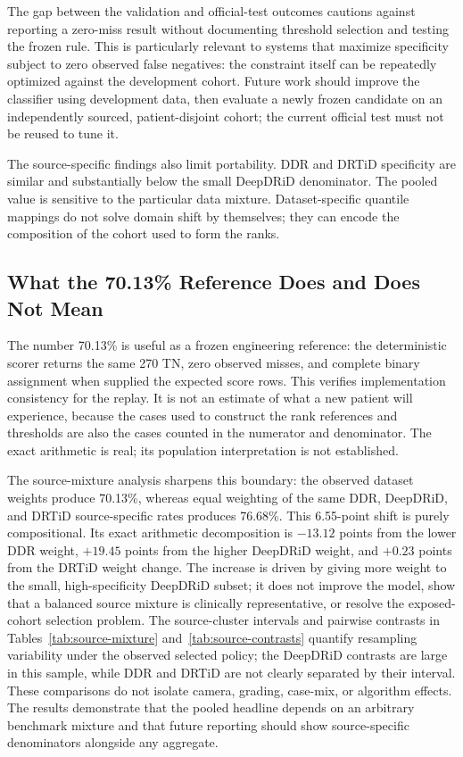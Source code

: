\documentclass{ieeeaccess}
\begin{document}
The gap between the validation and official-test outcomes cautions against reporting a zero-miss result without documenting threshold selection and testing the frozen rule. This is particularly relevant to systems that maximize specificity subject to zero observed false negatives: the constraint itself can be repeatedly optimized against the development cohort. Future work should improve the classifier using development data, then evaluate a newly frozen candidate on an independently sourced, patient-disjoint cohort; the current official test must not be reused to tune it.

The source-specific findings also limit portability. DDR and DRTiD specificity are similar and substantially below the small DeepDRiD denominator. The pooled value is sensitive to the particular data mixture. Dataset-specific quantile mappings do not solve domain shift by themselves; they can encode the composition of the cohort used to form the ranks.

\subsection{What the 70.13\% Reference Does and Does Not Mean}
The number 70.13\% is useful as a frozen engineering reference: the deterministic scorer returns the same 270 TN, zero observed misses, and complete binary assignment when supplied the expected score rows. This verifies implementation consistency for the replay. It is not an estimate of what a new patient will experience, because the cases used to construct the rank references and thresholds are also the cases counted in the numerator and denominator. The exact arithmetic is real; its population interpretation is not established.

The source-mixture analysis sharpens this boundary: the observed dataset weights produce 70.13\%, whereas equal weighting of the same DDR, DeepDRiD, and DRTiD source-specific rates produces 76.68\%. This 6.55-point shift is purely compositional. Its exact arithmetic decomposition is $-13.12$ points from the lower DDR weight, $+19.45$ points from the higher DeepDRiD weight, and $+0.23$ points from the DRTiD weight change. The increase is driven by giving more weight to the small, high-specificity DeepDRiD subset; it does not improve the model, show that a balanced source mixture is clinically representative, or resolve the exposed-cohort selection problem. The source-cluster intervals and pairwise contrasts in Tables~\ref{tab:source-mixture} and~\ref{tab:source-contrasts} quantify resampling variability under the observed selected policy; the DeepDRiD contrasts are large in this sample, while DDR and DRTiD are not clearly separated by their interval. These comparisons do not isolate camera, grading, case-mix, or algorithm effects. The results demonstrate that the pooled headline depends on an arbitrary benchmark mixture and that future reporting should show source-specific denominators alongside any aggregate.
\end{document}
